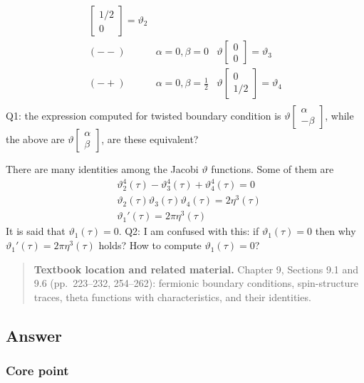 \documentclass[
  10pt,
  a4paper,
  openany]{book}
\begin{document}
\[\begin{array}{lll}
\begin{bmatrix}
1/2 \\
0
\end{bmatrix}=\vartheta_{2} \\ 
(--) & \alpha=0,\beta=0 & \vartheta \begin{bmatrix}
0 \\
0
\end{bmatrix}=\vartheta_{3} \\
(-+) & \alpha=0,\beta=\frac{1}{2} & \vartheta \begin{bmatrix}
0 \\
1/2
\end{bmatrix}=\vartheta_{4} \\
\end{array}
\] Q1: the expression computed for twisted boundary condition is
\(\vartheta \begin{bmatrix}\alpha\\-\beta\end{bmatrix}\), while the
above are \(\vartheta \begin{bmatrix}\alpha\\\beta\end{bmatrix}\), are
these equivalent?

There are many identities among the Jacobi \(\vartheta\) functions. Some
of them are \[
\begin{aligned}
&\vartheta_{2}^4(\tau)-\vartheta_{3}^4(\tau)+\vartheta_{4}^4(\tau)=0\\
&\vartheta_{2}(\tau)\vartheta_{3}(\tau)\vartheta_{4}(\tau)=2\eta^3(\tau)\\
&\vartheta_{1}'(\tau)=2\pi \eta^3(\tau)
\end{aligned}
\] It is said that \(\vartheta_{1}(\tau)=0\). Q2: I am confused with
this: if \(\vartheta_{1}(\tau)=0\) then why
\(\vartheta_{1}'(\tau)=2\pi \eta^3(\tau)\) holds? How to compute
\(\vartheta_{1}(\tau)=0\)?

\begin{quote}
\textbf{Textbook location and related material.} Chapter 9, Sections 9.1
and 9.6 (pp.~223--232, 254--262): fermionic boundary conditions,
spin-structure traces, theta functions with characteristics, and their
identities.
\end{quote}

\subsection{Answer}\label{answer-6}

\subsubsection{Core point}\label{core-point-6}
\end{document}
